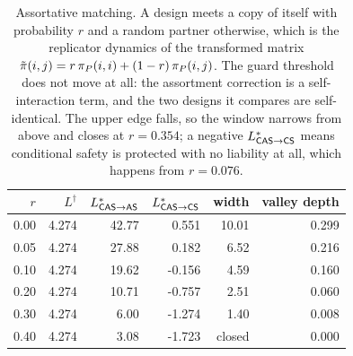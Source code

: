 \begin{table}[!ht]
\centering
\caption{Assortative matching. A design meets a copy of itself with probability $r$ and a random partner otherwise, which is the replicator dynamics of the transformed matrix $\tilde\pi(i,j)=r\,\pi_{P}(i,i)+(1-r)\,\pi_{P}(i,j)$. The guard threshold does not move at all: the assortment correction is a self-interaction term, and the two designs it compares are self-identical. The upper edge falls, so the window narrows from above and closes at $r=0.354$; a negative $L^{*}_{\textsf{CAS}\to\textsf{CS}}$ means conditional safety is protected with no liability at all, which happens from $r=0.076$.}
\label{tab:assortment}
\begin{tabular}{rrrrrr}
\toprule
$r$ & $L^{\dagger}$ & $L^{*}_{\textsf{CAS}\to\textsf{AS}}$ & $L^{*}_{\textsf{CAS}\to\textsf{CS}}$ & width & valley depth \\
\midrule
0.00 & 4.274 & 42.77 & 0.551 & 10.01 & 0.299 \\
0.05 & 4.274 & 27.88 & 0.182 & 6.52 & 0.216 \\
0.10 & 4.274 & 19.62 & -0.156 & 4.59 & 0.160 \\
0.20 & 4.274 & 10.71 & -0.757 & 2.51 & 0.060 \\
0.30 & 4.274 & 6.00 & -1.274 & 1.40 & 0.008 \\
0.40 & 4.274 & 3.08 & -1.723 & closed & 0.000 \\
\bottomrule
\end{tabular}
\end{table}
